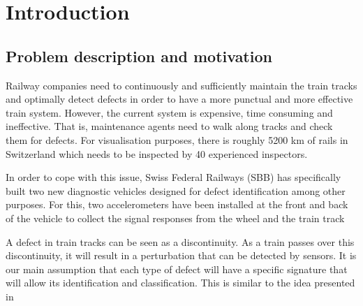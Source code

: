 



%



\maketitle

%
{
  \hypersetup{linkcolor=black}
  \tableofcontents
   
}
\newpage
\chapter{Introduction}
\section{Problem description and motivation}
Railway companies need to continuously and sufficiently maintain the train tracks and optimally detect defects in order to have a more punctual and more effective train system. However, the current system is expensive, time consuming and ineffective. That is, maintenance agents need to walk along tracks and check them for defects. For visualisation purposes, there is roughly 5200 km of rails in Switzerland which needs to be inspected by 40 experienced inspectors.


In order to cope with this issue, Swiss Federal Railways (SBB) has specifically built two new diagnostic vehicles designed for defect identification among other purposes. For this, two accelerometers have been installed at the front and back of the vehicle to collect the signal responses from the wheel and the train track

A defect in train tracks can be seen as a discontinuity. As a train passes over this discontinuity, it will result in a perturbation that can be detected by sensors. It is our main assumption that each type of defect will have a specific signature that will allow its identification and classification. This is similar to the idea presented in 

